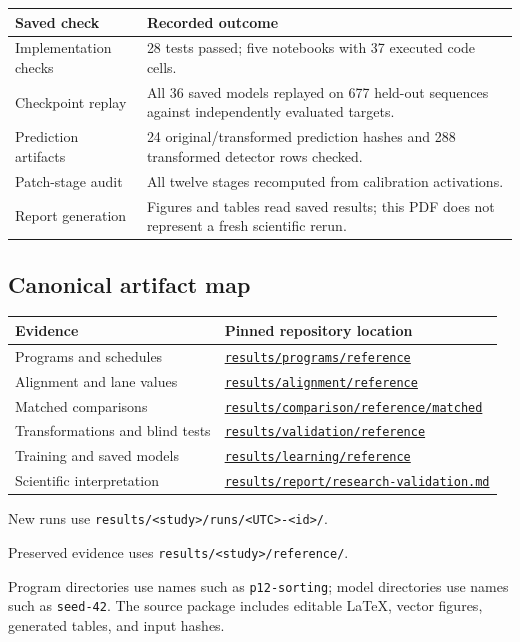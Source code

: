\documentclass[11pt,a4paper]{article}
\newcommand{\repopath}[1]{\href{https://github.com/raghulchandramouli/RaspFormer/blob/e06479ce09f10695aa5280162f80d880c060eaf5/#1}{\nolinkurl{#1}}}
\newcommand{\repodir}[1]{\href{https://github.com/raghulchandramouli/RaspFormer/tree/e06479ce09f10695aa5280162f80d880c060eaf5/#1}{\nolinkurl{#1}}}
\begin{document}
\begin{center}\small
\begin{tabularx}{\linewidth}{@{}P{.27\linewidth}X@{}}
\toprule
\textbf{Saved check} & \textbf{Recorded outcome}\\
\midrule
Implementation checks & 28 tests passed; five notebooks with 37 executed code cells.\\
Checkpoint replay & All 36 saved models replayed on 677 held-out sequences against independently evaluated targets.\\
Prediction artifacts & 24 original/transformed prediction hashes and 288 transformed detector rows checked.\\
Patch-stage audit & All twelve stages recomputed from calibration activations.\\
Report generation & Figures and tables read saved results; this PDF does not represent a fresh scientific rerun.\\
\bottomrule
\end{tabularx}\end{center}

\subsection*{Canonical artifact map}
\begingroup\small
\begin{tabularx}{\linewidth}{@{}P{.26\linewidth}X@{}}
\toprule
\textbf{Evidence} & \textbf{Pinned repository location}\\
\midrule
Programs and schedules & \repodir{results/programs/reference}\\
Alignment and lane values & \repodir{results/alignment/reference}\\
Matched comparisons & \repodir{results/comparison/reference/matched}\\
Transformations and blind tests & \repodir{results/validation/reference}\\
Training and saved models & \repodir{results/learning/reference}\\
Scientific interpretation & \repopath{results/report/research-validation.md}\\
\bottomrule
\end{tabularx}\endgroup

New runs use \nolinkurl{results/<study>/runs/<UTC>-<id>/}.
\par
Preserved evidence uses \nolinkurl{results/<study>/reference/}.
\par
Program directories use names such as \texttt{p12-sorting}; model directories use names such as \texttt{seed-42}. The source package includes editable LaTeX, vector figures, generated tables, and input hashes.
\end{document}
